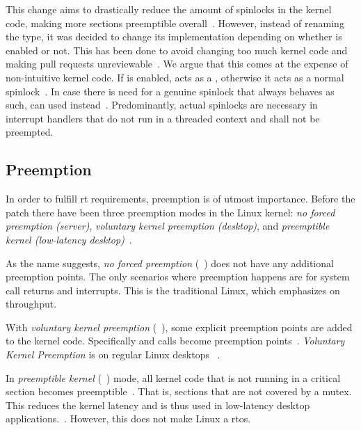 \documentclass[10pt,twocolumn,a4paper]{article}
\begin{document}
\noindent This change aims to drastically reduce the amount of spinlocks in the kernel code, making more sections preemptible overall~\cite{lf:sleeping-spinlocks}.
However, instead of renaming the type, it was decided to change its implementation depending on whether  is enabled or not.
This has been done to avoid changing too much kernel code and making pull requests unreviewable~\cite{reghenzani_realtime_2019}.
We argue that this comes at the expense of non-intuitive kernel code.
If  is enabled,  acts as a , otherwise it acts as a normal spinlock~\cite{mckenney_realtime_2005}.
In case there is need for a genuine spinlock that always behaves as such,  can used instead~\cite{mckenney_realtime_2005, chyyuu_github_2017}.
Predominantly, actual spinlocks are necessary in interrupt handlers that do not run in a threaded context and shall not be preempted.


\subsection{Preemption}\label{subsec:preemption}
In order to fulfill \acrshort{rt} requirements, preemption is of utmost importance.
Before the  patch there have been three preemption modes in the Linux kernel: \emph{no forced preemption (server)}, \emph{voluntary kernel preemption (desktop)}, and \emph{preemptible kernel (low-latency desktop)}~\cite{lf:preemption}.

As the name suggests, \emph{no forced preemption} (~\cite{mckenney_realtime_2005}) does not have any additional preemption points.
The only scenarios where preemption happens are for system call returns and interrupts.
This is the traditional Linux, which emphasizes on throughput.

With \emph{voluntary kernel preemption} (~\cite{mckenney_realtime_2005}), some explicit preemption points are added to the kernel code.
Specifically  and  calls become preemption points~\cite{day_re_2007}.
\emph{Voluntary Kernel Preemption} is on regular Linux desktops ~\cite{mckenney_realtime_2005}.

In \emph{preemptible kernel} (~\cite{mckenney_realtime_2005}) mode, all kernel code that is not running in a critical section becomes preemptible~\cite{lf:preemption}.
That is, sections that are not covered by a mutex.
This reduces the kernel latency and is thus used in low-latency desktop applications.~\cite{mckenney_realtime_2005}.
However, this does not make Linux a \acrshort{rtos}.
\newline
\end{document}
